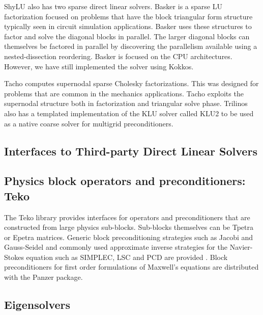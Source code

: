  ShyLU also has two sparse direct linear solvers. Basker is a sparse LU factorization focused on problems that have the block triangular form structure typically seen in circuit simulation applications. Basker uses these structures to factor and solve the diagonal blocks in parallel. The larger diagonal blocks can themselves be factored in parallel by discovering the parallelism available using a nested-dissection reordering. Basker is focused on the CPU architectures. However, we have still implemented the solver using Kokkos. 

 Tacho computes supernodal sparse Cholesky factorizations. This was designed for problems that are common in the mechanics applications. Tacho exploits the supernodal structure both in factorization and triangular solve phase.  Trilinos also has a templated implementation of the KLU solver called KLU2 to be used as a native coarse solver for multigrid preconditioners.

\subsection{Interfaces to Third-party Direct Linear Solvers}
\label{sec:TPLDirectSolvers}


\subsection{Physics block operators and preconditioners: Teko}
\label{sec:teko}

The Teko library provides interfaces for operators and preconditioners that are constructed from large physics sub-blocks.
Sub-blocks themselves can be Tpetra or Epetra matrices.
Generic block preconditioning strategies such as Jacobi and Gauss-Seidel and commonly used approximate inverse strategies for the Navier-Stokes equation such as SIMPLEC, LSC and PCD are provided \cite{CyrShadidEtAl2012_StabilizationScalableBlockPreconditioning}.
Block preconditioners for first order formulations of Maxwell's equations are distributed with the Panzer package.




\subsection{Eigensolvers}

